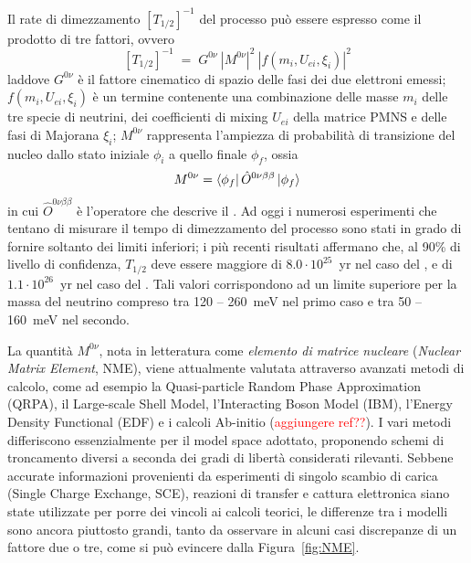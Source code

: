 Il rate di dimezzamento $ \left[ T_{1/2} \right]^{-1} $ del processo può essere espresso come il prodotto di tre fattori, ovvero
\begin{equation} \label{eq:rate_doppio_beta}
	\left[ T_{1/2} \right]^{-1} \; = \; G^{0 \nu} \: \left| M^{0 \nu} \right|^2 \: \left| f ( m_i, U_{ei}, \xi_i ) \right|^2 
\end{equation}
laddove $G^{0 \nu}$ è il fattore cinematico di spazio delle fasi dei due elettroni emessi; $ f ( m_i, U_{ei}, \xi_i ) $ è un termine contenente una combinazione delle masse $m_i$ delle tre specie di neutrini, dei coefficienti di mixing $U_{ei}$ della matrice PMNS e delle fasi di Majorana $\xi_i$; $M^{0 \nu}$ rappresenta l'ampiezza di probabilità di transizione del nucleo dallo stato iniziale $\phi_i$ a quello finale $\phi_f$, ossia
\begin{equation}
	M^{0 \nu} = \bra{\phi_f} \hat{O}^{0 \nu \beta \beta} \ket{\phi_f} 
\end{equation}
in cui $\hat{O}^{0 \nu \beta \beta}$ è l'operatore che descrive il \doppiobeta{}. 
Ad oggi i numerosi esperimenti che tentano di misurare il tempo di dimezzamento del processo sono stati in grado di fornire soltanto dei limiti inferiori; i più recenti risultati affermano che, al 90\% di livello di confidenza, $T_{1/2}$ deve essere maggiore di $8.0 \cdot 10^{25}$~yr nel caso del \cite{agostini:prl18}, e di $1.1 \cdot 10^{26}$~yr nel caso del \cite{gando:prl16}. Tali valori corrispondono ad un limite superiore per la massa del neutrino compreso tra 120 -- 260~meV nel primo caso e tra 50 -- 160~meV nel secondo.




La quantità $M^{0 \nu}$, nota in letteratura come \emph{elemento di matrice nucleare} (\emph{Nuclear Matrix Element}, NME), viene attualmente valutata attraverso avanzati metodi di calcolo, come ad esempio la Quasi-particle Random Phase Approximation (QRPA), il Large-scale Shell Model, l'Interacting Boson Model (IBM), l'Energy Density Functional (EDF) e i calcoli Ab-initio (\textcolor{red}{aggiungere ref??}). I vari metodi differiscono essenzialmente per il model space adottato, proponendo schemi di troncamento diversi a seconda dei gradi di libertà considerati rilevanti. 
Sebbene accurate informazioni provenienti da esperimenti di singolo scambio di carica (Single Charge Exchange, SCE), reazioni di transfer e cattura elettronica siano state utilizzate per porre dei vincoli ai calcoli teorici, le differenze tra i modelli sono ancora piuttosto grandi, tanto da osservare in alcuni casi discrepanze di un fattore due o tre, come si può evincere dalla Figura~\ref{fig:NME}. 


